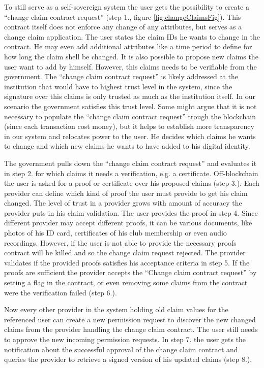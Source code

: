 To still serve as a self-sovereign system the user gets the possibility to create a “change claim contract request” (step 1., figure \ref{fig:changeClaimsFig}). This contract itself does not enforce any change of any attributes, but serves as a change claim application. The user states the claim IDs he wants to change in the contract. He may even add additional attributes like a time period to define for how long the claim shell be changed. It is also possible to propose new claims the user want to add by himself. However, this claims needs to be verifiable from the government. The “change claim contract request” is likely addressed at the institution that would have to highest trust level in the system, since the signature over this claims is only trusted as much as the institution itself. In our scenario the government satisfies this trust level. Some might argue that it is not necessary to populate the “change claim contract request” trough the blockchain (since each transaction cost money), but it helps to establish more transparency in our system and relocates power to the user. He decides which claims he wants to change and which new claims he wants to have added to his digital identity. 

The government pulls down the “change claim contract request” and evaluates it in step 2. for which claims it needs a verification, e.g. a certificate. Off-blockchain the user is asked for a proof or certificate over his proposed claims (step 3.). Each provider can define which kind of proof the user must provide to get his claim changed. The level of trust in a provider grows with amount of accuracy the provider puts in his claim validation. The user provides the proof in step 4. Since different provider may accept different proofs, it can be various documents, like photos of his ID card, certificates of his club membership or even audio recordings. However, if the user is not able to provide the necessary proofs contract will be killed and so the change claim request rejected.
The provider validates if the provided proofs satisfies his acceptance criteria in step 5.  If the proofs are sufficient the provider accepts the “Change claim contract request” by setting a flag in the contract, or even removing some claims from the contract were the verification failed (step 6.). 

Now every other provider in the system holding old claim values for the referenced user can create a new permission request to discover the new changed claims from the provider handling the change claim contract. The user still needs to approve the new incoming permission requests. In step 7. the user gets the notification about the successful approval of the change claim contract and queries the provider to retrieve a signed version of his updated claims (step 8.). 

